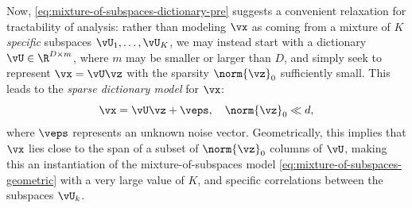 \documentclass[../../book-main.tex]{subfiles}
\begin{document}
Now, \eqref{eq:mixture-of-subspaces-dictionary-pre} suggests a
convenient relaxation for tractability of analysis: rather than
modeling $\vx$ as coming from a mixture of $K$ \textit{specific}
subspaces $\vU_1, \dots, \vU_K$, we may instead start with a
dictionary $\vU \in \R^{D \times m}$, where $m$ may be smaller or
larger than $D$, and simply seek to represent $\vx = \vU \vz$ with
the sparsity $\norm{\vz}_0$ sufficiently small.
This leads to the \textit{sparse dictionary model} for $\vx$:
\begin{equation}\label{eq:mixture-of-subspaces-dictionary}
    \vx =  \vU \vz + \veps,
    \quad
    \norm{\vz}_0 \ll d,
\end{equation}
where $\veps$ represents an unknown noise vector.
Geometrically, this implies that $\vx$ lies close to the span of a
subset of $\norm{\vz}_0$ columns of $\vU$,
making this an instantiation of the mixture-of-subspaces model
\eqref{eq:mixture-of-subspaces-geometric} with a very large value of
$K$, and specific correlations between the subspaces $\vU_k$.
\end{document}
